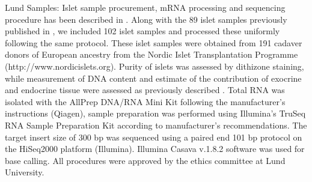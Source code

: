 Lund Samples: Islet sample procurement, mRNA processing and sequencing procedure has been described in \cite{fadistaGlobalGenomicTranscriptomic2014}. Along with the 89 islet samples previously published in \cite{fadistaGlobalGenomicTranscriptomic2014}, we included 102 islet samples and processed these uniformly following the same protocol. These islet samples were obtained from 191 cadaver donors of European ancestry from the Nordic Islet Transplantation Programme (http://www.nordicislets.org). Purity of islets was assessed by dithizone staining, while measurement of DNA content and estimate of the contribution of exocrine and endocrine tissue were assessed as previously described \cite{fadistaGlobalGenomicTranscriptomic2014}. Total RNA was isolated with the AllPrep DNA/RNA Mini Kit following the manufacturer's instructions (Qiagen), sample preparation was performed using Illumina's TruSeq RNA Sample Preparation Kit according to manufacturer's recommendations. The target insert size of 300 bp was sequenced using a paired end 101 bp protocol on the HiSeq2000 platform (Illumina). Illumina Casava v.1.8.2 software was used for base calling. All procedures were approved by the ethics committee at Lund University.
